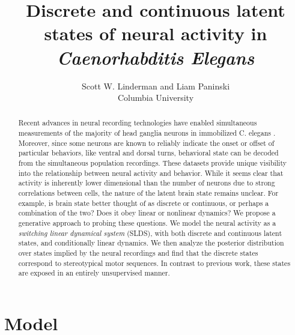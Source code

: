 \documentclass{article}
\title{Discrete and continuous latent states of neural activity in \textit{Caenorhabditis Elegans}}
\author{Scott W. Linderman 
  and
  Liam Paninski \\
  Columbia University
}
\begin{document}
\singlespacing
\maketitle

\begin{abstract}
  Recent advances in neural recording technologies have enabled
  simultaneous measurements of the majority of head ganglia neurons in
  immobilized C. elegans \cite{kato2015global}. Moreover, since some
  neurons are known to reliably indicate the onset or offset of
  particular behaviors, like ventral and dorsal turns, behavioral
  state can be decoded from the simultaneous population recordings.
  These datasets provide unique visibility into the relationship
  between neural activity and behavior.  While it seems clear that
  activity is inherently lower dimensional than the number of neurons
  due to strong correlations between cells, the nature of the latent brain state
  remains unclear. For example, is brain state better thought of as
  discrete or continuous, or perhaps a combination of the two? Does it
  obey linear or nonlinear dynamics?  We propose a generative approach
  to probing these questions. We model the neural activity as a
  \emph{switching linear dynamical system} (SLDS), with both discrete
  and continuous latent states, and conditionally linear dynamics.  We
  then analyze the posterior distribution over states implied by the
  neural recordings and find that the discrete states correspond to
  stereotypical motor sequences. In contrast to previous work, these
  states are exposed in an entirely unsupervised manner.
\end{abstract}

\onehalfspacing

\section{Model}
\end{document}
